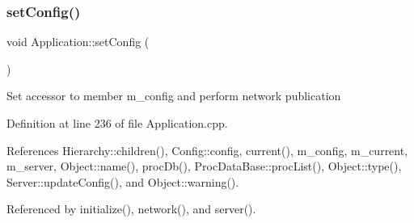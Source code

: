 \subsubsection{\texorpdfstring{set\+Config()}{setConfig()}}
{\footnotesize\ttfamily void Application\+::set\+Config (\begin{DoxyParamCaption}{ }\end{DoxyParamCaption})}

Set accessor to member m\+\_\+config and perform network publication 

Definition at line 236 of file Application.\+cpp.



References Hierarchy\+::children(), Config\+::config, current(), m\+\_\+config, m\+\_\+current, m\+\_\+server, Object\+::name(), proc\+Db(), Proc\+Data\+Base\+::proc\+List(), Object\+::type(), Server\+::update\+Config(), and Object\+::warning().



Referenced by initialize(), network(), and server().


